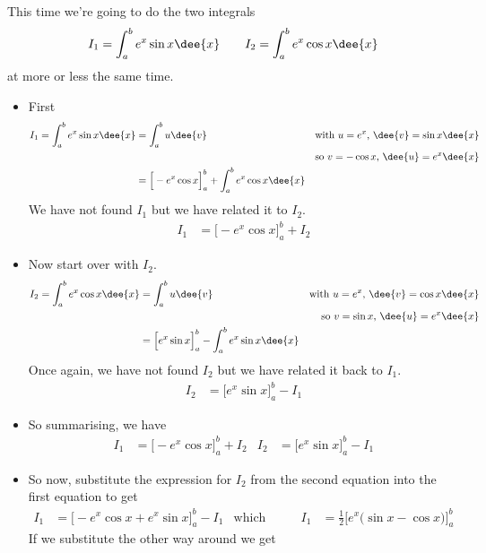 \begin{eg}
\label{eg:PRTSexsinx}

This time we're going to do the two integrals
\begin{align*}
I_1=\int_a^b e^x\sin x\dee{x}\qquad
I_2=\int_a^b e^x\cos x\dee{x}
\end{align*}
at more or less the same time.

\begin{itemize}
 \item First
\begin{align*}
I_1=\int_a^b e^x\sin x\dee{x}
&=\int_a^b u \dee{v} &\text{with $u=e^x$, $\dee{v} = \sin x\dee{x}$} \\
               &&\text{so $v = -\cos x$, $\dee{u}= e^x\dee{x}$} \\
&=\Big[-e^x\cos x\Big]_a^b +\int_a^b e^x\cos x\dee{x}
\end{align*}
We have not found $I_1$ but we have related it to $I_2$.
\begin{align*}
I_1&=\Big[-e^x\cos x\Big]_a^b +I_2
\end{align*}
\item Now start over with $I_2$.
\begin{align*}
I_2=\int_a^b e^x\cos x\dee{x}
&=\int_a^b u\dee{v} &\text{with $u=e^x$, $\dee{v} = \cos x\dee{x}$}\\
                   &&\text{so $v = \sin x$, $\dee{u}= e^x\dee{x}$} \\
&=\Big[e^x\sin x\Big]_a^b -\int_a^b e^x\sin x\dee{x}
\end{align*}
Once again, we have not found $I_2$ but we have related it back to $I_1$.
\begin{align*}
I_2&=\Big[e^x\sin x\Big]_a^b -I_1
\end{align*}
\item So summarising, we have
\begin{align*}
I_1&=\Big[-e^x\cos x\Big]_a^b +I_2
& I_2&=\Big[e^x\sin x\Big]_a^b -I_1
\end{align*}
\item So now, substitute the expression for $I_2$ from the second equation into the first
equation to get
\begin{align*}
I_1 &=\Big[-e^x\cos x +e^x\sin x\Big]_a^b -I_1
& \text{which implies}&&
I_1&=\frac{1}{2}\Big[e^x\big(\sin x-\cos x\big)\Big]_a^b
\end{align*}
If we substitute the other way around we get
\begin{align*}

\end{align*}
\end{itemize}
\end{eg}
